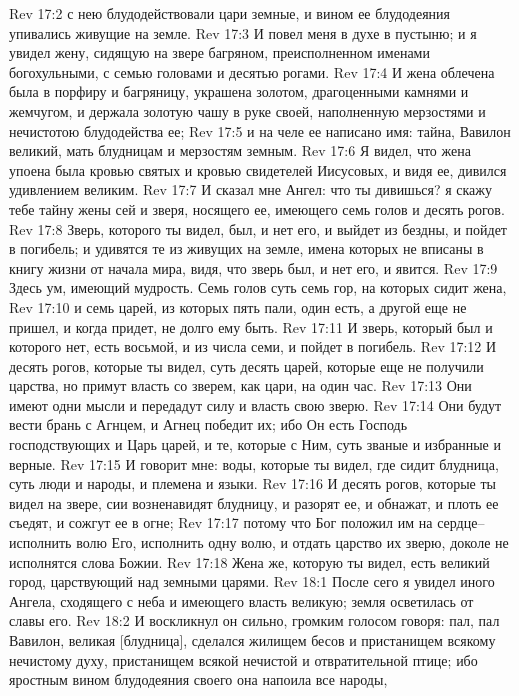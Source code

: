 Rev 17:2  с нею блудодействовали цари земные, и вином ее блудодеяния упивались живущие на земле.
Rev 17:3  И повел меня в духе в пустыню; и я увидел жену, сидящую на звере багряном, преисполненном именами богохульными, с семью головами и десятью рогами.
Rev 17:4  И жена облечена была в порфиру и багряницу, украшена золотом, драгоценными камнями и жемчугом, и держала золотую чашу в руке своей, наполненную мерзостями и нечистотою блудодейства ее;
Rev 17:5  и на челе ее написано имя: тайна, Вавилон великий, мать блудницам и мерзостям земным.
Rev 17:6  Я видел, что жена упоена была кровью святых и кровью свидетелей Иисусовых, и видя ее, дивился удивлением великим.
Rev 17:7  И сказал мне Ангел: что ты дивишься? я скажу тебе тайну жены сей и зверя, носящего ее, имеющего семь голов и десять рогов.
Rev 17:8  Зверь, которого ты видел, был, и нет его, и выйдет из бездны, и пойдет в погибель; и удивятся те из живущих на земле, имена которых не вписаны в книгу жизни от начала мира, видя, что зверь был, и нет его, и явится.
Rev 17:9  Здесь ум, имеющий мудрость. Семь голов суть семь гор, на которых сидит жена,
Rev 17:10  и семь царей, из которых пять пали, один есть, а другой еще не пришел, и когда придет, не долго ему быть.
Rev 17:11  И зверь, который был и которого нет, есть восьмой, и из числа семи, и пойдет в погибель.
Rev 17:12  И десять рогов, которые ты видел, суть десять царей, которые еще не получили царства, но примут власть со зверем, как цари, на один час.
Rev 17:13  Они имеют одни мысли и передадут силу и власть свою зверю.
Rev 17:14  Они будут вести брань с Агнцем, и Агнец победит их; ибо Он есть Господь господствующих и Царь царей, и те, которые с Ним, суть званые и избранные и верные.
Rev 17:15  И говорит мне: воды, которые ты видел, где сидит блудница, суть люди и народы, и племена и языки.
Rev 17:16  И десять рогов, которые ты видел на звере, сии возненавидят блудницу, и разорят ее, и обнажат, и плоть ее съедят, и сожгут ее в огне;
Rev 17:17  потому что Бог положил им на сердце--исполнить волю Его, исполнить одну волю, и отдать царство их зверю, доколе не исполнятся слова Божии.
Rev 17:18  Жена же, которую ты видел, есть великий город, царствующий над земными царями.
Rev 18:1  После сего я увидел иного Ангела, сходящего с неба и имеющего власть великую; земля осветилась от славы его.
Rev 18:2  И воскликнул он сильно, громким голосом говоря: пал, пал Вавилон, великая [блудница], сделался жилищем бесов и пристанищем всякому нечистому духу, пристанищем всякой нечистой и отвратительной птице; ибо яростным вином блудодеяния своего она напоила все народы,
